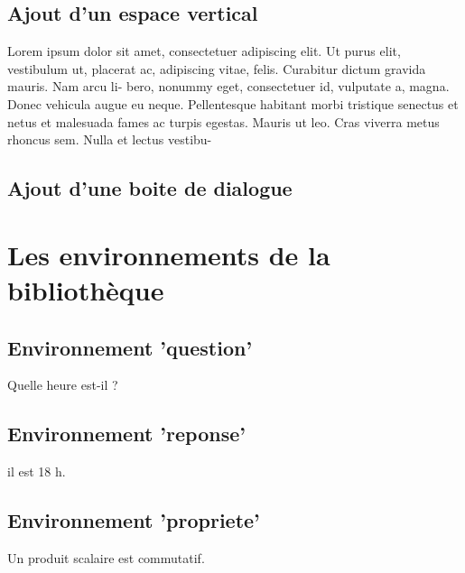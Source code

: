 \subsection{Ajout d'un espace vertical}

Lorem ipsum dolor sit amet, consectetuer adipiscing elit. Ut purus elit, vestibulum
ut, placerat ac, adipiscing vitae, felis. Curabitur dictum gravida mauris. Nam arcu li- \sn
{}
bero, nonummy eget, consectetuer id, vulputate a, magna. Donec vehicula augue eu
neque. Pellentesque habitant morbi tristique senectus et netus et malesuada fames ac
turpis egestas. Mauris ut leo. Cras viverra metus rhoncus sem. Nulla et lectus vestibu-

\subsection{Ajout d'une boite de dialogue}


\section{Les environnements de la bibliothèque}

\subsection{Environnement 'question' }

\begin{question}
Quelle heure est-il ?
\end{question}

\subsection{Environnement 'reponse' }

\begin{reponse}
il est 18 h.
\end{reponse}

\subsection{Environnement 'propriete' }

\begin{propriete}
Un produit scalaire est commutatif.
\end{propriete}

